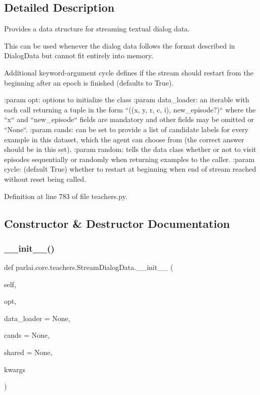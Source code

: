 \subsection{Detailed Description}
\begin{DoxyVerb}Provides a data structure for streaming textual dialog data.

This can be used whenever the dialog data follows the format described in
DialogData but cannot fit entirely into memory.

Additional keyword-argument cycle defines if the stream should restart from
the beginning after an epoch is finished (defaults to True).

:param opt:
    options to initialize the class
:param data_loader:
    an iterable with each call returning a tuple in the form
    ``((x, y, r, c, i), new_episode?)`` where the ``x`` and ``new_episode``
    fields are mandatory and other fields may be omitted or ``None``.
:param cands:
    can be set to provide a list of candidate labels for every example in
    this dataset, which the agent can choose from (the correct answer
    should be in this set).
:param random:
    tells the data class whether or not to visit episodes sequentially or
    randomly when returning examples to the caller.
:param cycle:
    (default True) whether to restart at beginning when end of stream
    reached without reset being called.
\end{DoxyVerb}
 

Definition at line 783 of file teachers.\+py.



\subsection{Constructor \& Destructor Documentation}
\mbox{\label{classparlai_1_1core_1_1teachers_1_1StreamDialogData_a72324ec2775d16b31d1d18287a8f84e9}} 
\subsubsection{\texorpdfstring{\+\_\+\+\_\+init\+\_\+\+\_\+()}{\_\_init\_\_()}}
{\footnotesize\ttfamily def parlai.\+core.\+teachers.\+Stream\+Dialog\+Data.\+\_\+\+\_\+init\+\_\+\+\_\+ (\begin{DoxyParamCaption}\item[{}]{self,  }\item[{}]{opt,  }\item[{}]{data\+\_\+loader = {\ttfamily None},  }\item[{}]{cands = {\ttfamily None},  }\item[{}]{shared = {\ttfamily None},  }\item[{}]{kwargs }\end{DoxyParamCaption})}




